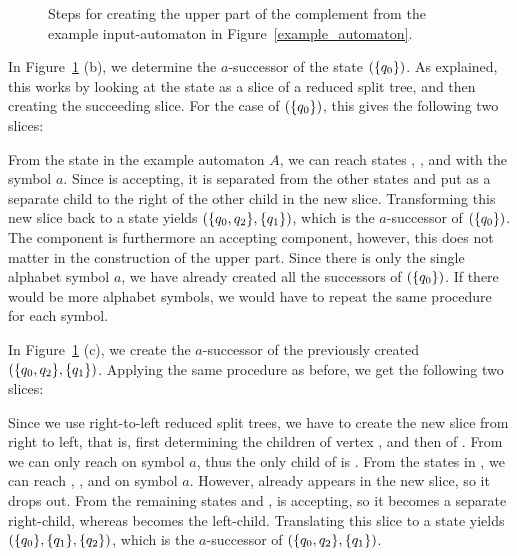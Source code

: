 \begin{figure}[htb]
\centering
  \begin{subfigure}[t]{0.49\textwidth}
  \centering
  \UpperPartA
  \caption{}
  \end{subfigure}
  \hfill
  \begin{subfigure}[t]{0.49\textwidth}
  \centering
  \UpperPartB
  \caption{}
  \end{subfigure}

  \begin{subfigure}[t]{0.49\textwidth}
  \centering
  \UpperPartC
  \caption{}
  \end{subfigure}
  \hfill
  \begin{subfigure}[t]{0.49\textwidth}
  \centering
  \UpperPartD
  \caption{}
  \end{subfigure}
\caption{Steps for creating the upper part of the complement from the example input-automaton in Figure~\ref{example_automaton}.}
\label{steps_upper}
\end{figure}

In Figure~\ref{steps_upper} (b), we determine the $a$-successor of the state $(\{q_{0}\})$. As explained, this works by looking at the state as a slice of a reduced split tree, and then creating the succeeding slice. For the case of $(\{q_{0}\})$, this gives the following two slices:

\SlicesOne

From the state  in the example automaton $A$, we can reach states , , and  with the symbol $a$. Since  is accepting, it is separated from the other states and put as a separate child to the right of the other child in the new slice. Transforming this new slice back to a state yields $(\{q_{0},q_{2}\}, \{q_{1}\})$, which is the $a$-successor of $(\{q_{0}\})$. The component  is furthermore an accepting component, however, this does not matter in the construction of the upper part. Since there is only the single alphabet symbol $a$, we have already created all the successors of $(\{q_{0}\})$. If there would be more alphabet symbols, we would have to repeat the same procedure for each symbol.

In Figure~\ref{steps_upper} (c), we create the $a$-successor of the previously created $(\{q_{0},q_{2}\}, \{q_{1}\})$. Applying the same procedure as before, we get the following two slices:

\SlicesTwo

Since we use right-to-left reduced split trees, we have to create the new slice from right to left, that is, first determining the children of vertex , and then of . From  we can only reach  on symbol $a$, thus the only child of  is . From the states in , we can reach , , and  on symbol $a$. However,  already appears in the new slice, so it drops out. From the remaining states  and ,  is accepting, so it becomes a separate right-child, whereas  becomes the left-child. Translating this slice to a state yields $(\{q_{0}\}, \{q_{1}\}, \{q_{2}\})$, which is the $a$-successor of $(\{q_{0},q_{2}\}, \{q_{1}\})$.

